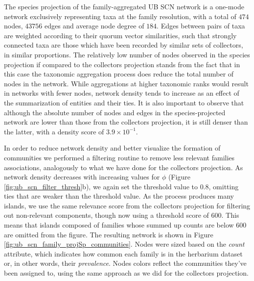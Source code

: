 The species projection of the family-aggregated UB SCN network is a one-mode network exclusively representing taxa at the family resolution, with a total of $474$ nodes, $43756$ edges and average node degree of $184$.
Edges between pairs of taxa are weighted according to their quorum vector similarities, such that strongly connected taxa are those which have been recorded by similar sets of collectors, in similar proportions.
%
The relatively low number of nodes observed in the species projection if compared to the collectors projection stands from the fact that in this case the taxonomic aggregation process does reduce the total number of nodes in the network.
While aggregations at higher taxonomic ranks would result in networks with fewer nodes, network density tends to increase as an effect of the summarization of entities and their ties.
%
It is also important to observe that although the absolute number of nodes and edges in the species-projected network are lower than those from the collectors projection, it is still denser than the latter, with a density score of $3.9 \times 10^{-1}$.

In order to reduce network density and better visualize the formation of communities we performed a filtering routine to remove less relevant families associations, analogously to what we have done for the collectors projection.
As network density decreases with increasing values for $\phi$ (Figure \ref{fig:ub_scn_filter_thresh}b), we again set the threshold value to $0.8$, omitting ties that are weaker than the threshold value. 
As the process produces many islands, we use the same relevance score from the collectors projection for filtering out non-relevant components, though now using a threshold score of $600$. 
This means that islands composed of families whose summed up counts are below $600$ are omitted from the figure. 
The resulting network is shown in Figure \ref{fig:ub_scn_family_projSp_communities}.
Nodes were sized based on the \textit{count} attribute, which indicates how common each family is in the herbarium dataset or, in other words, their \textit{prevalence}. 
Nodes colors reflect the communities they've been assigned to, using the same approach as we did for the collectors projection.

